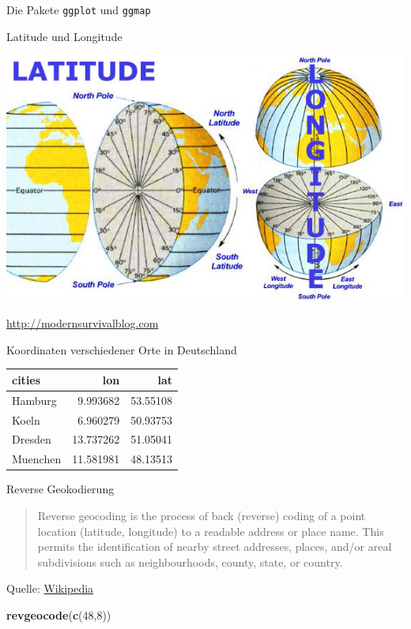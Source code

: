 \documentclass[ignorenonframetext,]{beamer}
\newenvironment{Shaded}{}{}
\newcommand{\KeywordTok}[1]{\textcolor[rgb]{0.00,0.44,0.13}{\textbf{{#1}}}}
\newcommand{\DecValTok}[1]{\textcolor[rgb]{0.25,0.63,0.44}{{#1}}}
\newcommand{\NormalTok}[1]{{#1}}
\begin{document}
\begin{frame}[fragile]{Die Pakete \texttt{ggplot} und \texttt{ggmap}}
\begin{block}{Latitude und Longitude}

\includegraphics{./tex2pdf.9796/ddeb10457ad1d77e274118c007d518537082f34a.jpg}

\href{http://modernsurvivalblog.com/survival-skills/basic-map-reading-latitude-longitude/}{http://modernsurvivalblog.com}

\end{block}

\begin{block}{Koordinaten verschiedener Orte in Deutschland}

\begin{longtable}[]{@{}lrr@{}}
\toprule
cities & lon & lat\tabularnewline
\midrule
\endhead
Hamburg & 9.993682 & 53.55108\tabularnewline
Koeln & 6.960279 & 50.93753\tabularnewline
Dresden & 13.737262 & 51.05041\tabularnewline
Muenchen & 11.581981 & 48.13513\tabularnewline
\bottomrule
\end{longtable}

\end{block}

\begin{block}{Reverse Geokodierung}

\begin{quote}
Reverse geocoding is the process of back (reverse) coding of a point
location (latitude, longitude) to a readable address or place name. This
permits the identification of nearby street addresses, places, and/or
areal subdivisions such as neighbourhoods, county, state, or country.
\end{quote}

Quelle:
\href{https://en.wikipedia.org/wiki/Reverse_geocoding}{Wikipedia}

\begin{Shaded}
\begin{Highlighting}[]
\KeywordTok{revgeocode}\NormalTok{(}\KeywordTok{c}\NormalTok{(}\DecValTok{48}\NormalTok{,}\DecValTok{8}\NormalTok{))}
\end{Highlighting}
\end{Shaded}


\end{block}
\end{frame}
\end{document}
